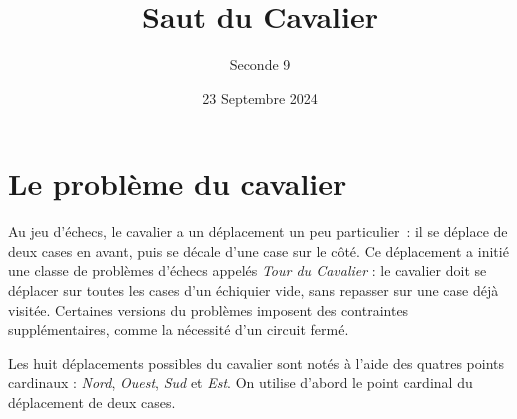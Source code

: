 \documentclass{article}
\title{Saut du Cavalier}
\author{Seconde 9}
\date{23 Septembre 2024}
\begin{document}
\maketitle
\section*{Le problème du cavalier}
Au jeu d'échecs, le cavalier a un déplacement un peu particulier~: il se déplace de deux cases en avant, puis se \og décale \fg d'une case sur le côté. Ce déplacement a initié une classe de problèmes d'échecs appelés \emph{\og Tour du Cavalier \fg} : le cavalier doit se déplacer sur toutes les cases d'un échiquier vide, sans repasser sur une case déjà visitée. Certaines versions du problèmes imposent des contraintes supplémentaires, comme la nécessité d'un circuit fermé.

\begin{center}
\setmainfont{DejaVu Sans}
\end{center}

Les huit déplacements possibles du cavalier sont notés à l'aide des quatres points cardinaux : \emph{Nord}, \emph{Ouest}, \emph{Sud} et \emph{Est}. On utilise d'abord le point cardinal du déplacement de deux cases.
\end{document}
